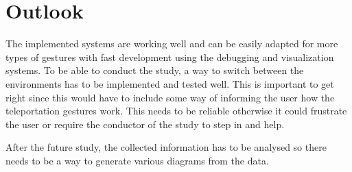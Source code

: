 \chapter{Outlook}

The implemented systems are working well and can be easily adapted for more types of gestures with fast development using the debugging and visualization systems. To be able to conduct the study, a way to switch between the environments has to be implemented and tested well. This is important to get right since this would have to include some way of informing the user how the teleportation gestures work. This needs to be reliable otherwise it could frustrate the user or require the conductor of the study to step in and help.  

After the future study, the collected information has to be analysed so there needs to be a way to generate various diagrams from the data.